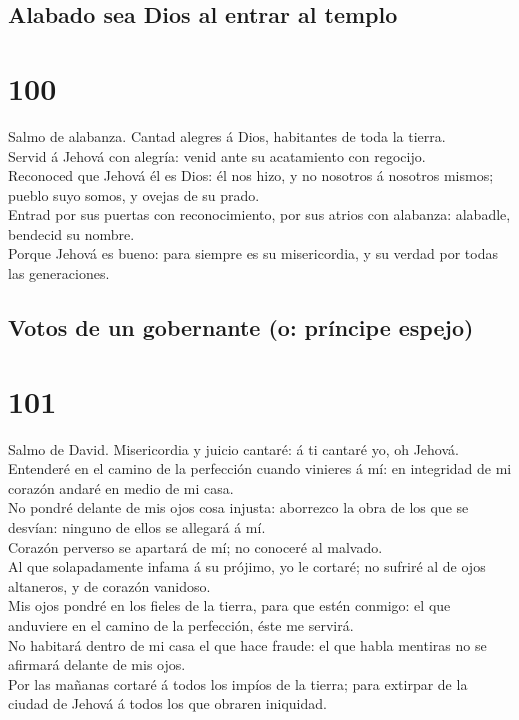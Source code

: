 \hypertarget{alabado-sea-dios-al-entrar-al-templo}{%
\subsection{Alabado sea Dios al entrar al
templo}\label{alabado-sea-dios-al-entrar-al-templo}}

\hypertarget{section-19-100}{%
\section{100}\label{section-19-100}}

 Salmo de alabanza. Cantad alegres á Dios, habitantes de
toda la tierra.\\
 Servid á Jehová con alegría: venid ante su acatamiento
con regocijo.\\
 Reconoced que Jehová él es Dios: él nos hizo, y no
nosotros á nosotros mismos; pueblo suyo somos, y ovejas de su prado.\\
 Entrad por sus puertas con reconocimiento, por sus atrios
con alabanza: alabadle, bendecid su nombre.\\
 Porque Jehová es bueno: para siempre es su misericordia,
y su verdad por todas las generaciones.

\hypertarget{votos-de-un-gobernante-o-pruxedncipe-espejo}{%
\subsection{Votos de un gobernante (o: príncipe
espejo)}\label{votos-de-un-gobernante-o-pruxedncipe-espejo}}

\hypertarget{section-19-101}{%
\section{101}\label{section-19-101}}

 Salmo de David. Misericordia y juicio cantaré: á ti
cantaré yo, oh Jehová.\\
 Entenderé en el camino de la perfección cuando vinieres á
mí: en integridad de mi corazón andaré en medio de mi casa.\\
 No pondré delante de mis ojos cosa injusta: aborrezco la
obra de los que se desvían: ninguno de ellos se allegará á mí.\\
 Corazón perverso se apartará de mí; no conoceré al
malvado.\\
 Al que solapadamente infama á su prójimo, yo le cortaré;
no sufriré al de ojos altaneros, y de corazón vanidoso.\\
 Mis ojos pondré en los fieles de la tierra, para que
estén conmigo: el que anduviere en el camino de la perfección, éste me
servirá.\\
 No habitará dentro de mi casa el que hace fraude: el que
habla mentiras no se afirmará delante de mis ojos.\\
 Por las mañanas cortaré á todos los impíos de la tierra;
para extirpar de la ciudad de Jehová á todos los que obraren iniquidad.

